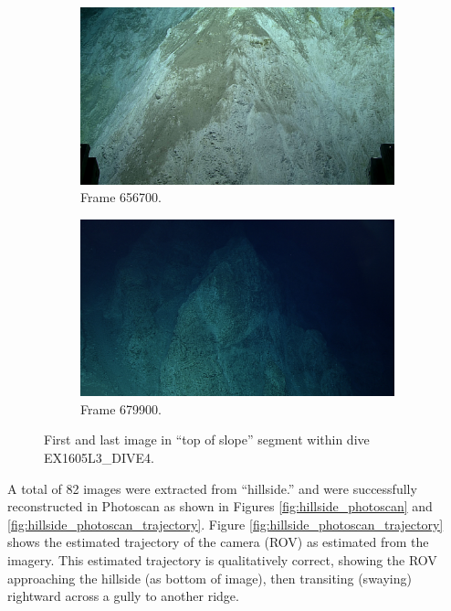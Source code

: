 \documentclass[letterpaper,12pt]{article}
\begin{document}
\begin{figure}[p]
    \centering
    \begin{subfigure}[b]{0.48\textwidth}
        \includegraphics[width=\textwidth]{images/image_656700.png}
        \caption{Frame 656700.}
        \label{fig:ex1605l3_dive4_top_of_slope_begin}
    \end{subfigure}
    \begin{subfigure}[b]{0.48\textwidth}
        \includegraphics[width=\textwidth]{images/image_679900.png}
        \caption{Frame 679900.}
        \label{fig:ex1605l3_dive4_top_of_slope_end}
    \end{subfigure}
    \caption{First and last image in ``top of slope'' segment within dive EX1605L3\_DIVE4.}
\end{figure}

A total of 82 images were extracted from ``hillside.'' and were successfully reconstructed in Photoscan as shown in Figures \ref{fig:hillside_photoscan} and \ref{fig:hillside_photoscan_trajectory}.  Figure \ref{fig:hillside_photoscan_trajectory} shows the estimated trajectory of the camera (ROV) as estimated from the imagery.  This estimated trajectory is qualitatively correct, showing the ROV approaching the hillside (as bottom of image), then transiting (swaying) rightward across a gully to another ridge.   
\end{document}
